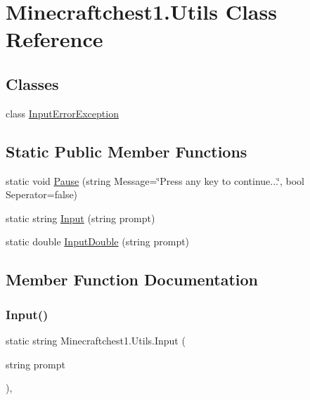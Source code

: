 \hypertarget{class_minecraftchest1_1_1_utils}{}\section{Minecraftchest1.\+Utils Class Reference}
\label{class_minecraftchest1_1_1_utils}
\subsection*{Classes}
\begin{DoxyCompactItemize}
\item 
class \hyperlink{class_minecraftchest1_1_1_utils_1_1_input_error_exception}{Input\+Error\+Exception}
\end{DoxyCompactItemize}
\subsection*{Static Public Member Functions}
\begin{DoxyCompactItemize}
\item 
static void \hyperlink{class_minecraftchest1_1_1_utils_a93d87d31f16115eb3ef2da07ef774530}{Pause} (string Message=\char`\"{}Press any key to continue...\char`\"{}, bool Seperator=false)
\item 
static string \hyperlink{class_minecraftchest1_1_1_utils_acc8f15ceee7fa0c1c521cdb582bc3910}{Input} (string prompt)
\item 
static double \hyperlink{class_minecraftchest1_1_1_utils_a0f88327089e8a17005bc3c7981487c32}{Input\+Double} (string prompt)
\end{DoxyCompactItemize}


\subsection{Member Function Documentation}
\mbox{\label{class_minecraftchest1_1_1_utils_acc8f15ceee7fa0c1c521cdb582bc3910}} 
\subsubsection{\texorpdfstring{Input()}{Input()}}
{\footnotesize\ttfamily static string Minecraftchest1.\+Utils.\+Input (\begin{DoxyParamCaption}\item[{string}]{prompt }\end{DoxyParamCaption})\hspace{0.3cm}{\ttfamily [inline]}, {\ttfamily [static]}}


